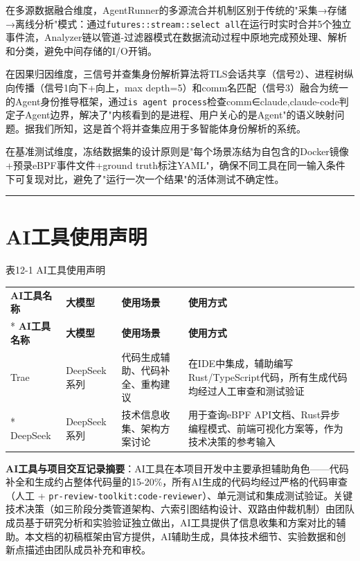 \documentclass[a4paper]{ctexart}
\makeatletter
\renewcommand{\_}{%
  \ifmmode
    \nfss@text{\textunderscore}%
  \else
    \textunderscore\discretionary{}{}{}%
  \fi}
\makeatother
\begin{document}
在多源数据融合维度，AgentRunner的多源流合并机制区别于传统的"采集→存储→离线分析"模式：通过\texttt{futures::stream::select\_all}在运行时实时合并5个独立事件流，Analyzer链以管道-过滤器模式在数据流动过程中原地完成预处理、解析和分类，避免中间存储的I/O开销。


在因果归因维度，三信号并查集身份解析算法将TLS会话共享（信号2）、进程树纵向传播（信号1向下+向上，max\_depth=5）和comm名匹配（信号3）融合为统一的Agent身份推导框架，通过\texttt{is\_agent\_process}检查comm∈{claude,claude-code}判定子Agent边界，解决了"内核看到的是进程、用户关心的是Agent"的语义映射问题。据我们所知，这是首个将并查集应用于多智能体身份解析的系统。


在基准测试维度，冻结数据集的设计原则是"每个场景冻结为自包含的Docker镜像+预录eBPF事件文件+ground truth标注YAML"，确保不同工具在同一输入条件下可复现对比，避免了"运行一次一个结果"的活体测试不确定性。


\bigskip
\hrule
\bigskip


\section{AI工具使用声明}





\medskip
{\centering\small
表12-1 AI工具使用声明\par
\vspace{3pt}
\setlength{\tabcolsep}{6pt}
\renewcommand{\arraystretch}{1.1}
\begin{longtable}{p{4.2cm} p{2.9cm} >{\raggedright\arraybackslash}p{3.6cm} >{\raggedright\arraybackslash}p{3.6cm}}
\hline
\textbf{AI工具名称} & \textbf{大模型} & \textbf{使用场景} & \textbf{使用方式} \\*
\hline
\endfirsthead
\hline
\textbf{AI工具名称} & \textbf{大模型} & \textbf{使用场景} & \textbf{使用方式} \\
\hline
\endhead
\hline
\endfoot
\hline
\endlastfoot
Trae & DeepSeek系列 & 代码生成辅助、代码补全、重构建议 & 在IDE中集成，辅助编写Rust/TypeScript代码，所有生成代码均经过人工审查和测试验证 \\*
\hline
DeepSeek & DeepSeek系列 & 技术信息收集、架构方案讨论 & 用于查询eBPF API文档、Rust异步编程模式、前端可视化方案等，作为技术决策的参考输入 \\
\hline
\end{longtable}
\par}



\textbf{AI工具与项目交互记录摘要}：AI工具在本项目开发中主要承担辅助角色——代码补全和生成约占整体代码量的15-20\%，所有AI生成的代码均经过严格的代码审查（人工 + \texttt{pr-review-toolkit:code-reviewer}）、单元测试和集成测试验证。关键技术决策（如三阶段分类管道架构、六索引图结构设计、双路由仲裁机制）由团队成员基于研究分析和实验验证独立做出，AI工具提供了信息收集和方案对比的辅助。本文档的初稿框架由官方提供，AI辅助生成，具体技术细节、实验数据和创新点描述由团队成员补充和审校。
\end{document}
